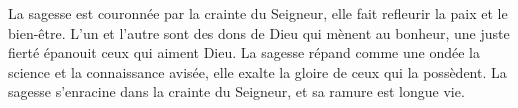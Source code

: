 La sagesse est couronnée par la crainte du Seigneur,
	elle fait refleurir la paix et le bien-être.
L’un et l’autre sont des dons de Dieu qui mènent au bonheur,
	une juste fierté épanouit ceux qui aiment Dieu.
La sagesse répand comme une ondée la science et la connaissance avisée,
	elle exalte la gloire de ceux qui la possèdent.
La sagesse s’enracine dans la crainte du Seigneur,
	et sa ramure est longue vie.
